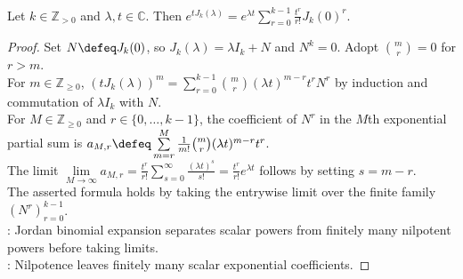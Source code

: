 \begin{proposition} \label{prop:exponential-of-jordan-block} \\
Let $k\in\mathbb{Z}_{>0}$ and $\lambda,t\in\mathbb{C}$. Then $e^{tJ_k(\lambda)}=e^{\lambda t}\sum\limits_{r=0}^{k-1}\frac{t^r}{r!}J_k(0)^r$.
\begin{proof}
Set $N\defeq J_k(0)$, so $J_k(\lambda)=\lambda I_k+N$ and $N^k=0$. Adopt $\binom{m}{r}=0$ for $r>m$.\\
For $m\in\mathbb{Z}_{\geq0}$, $(tJ_k(\lambda))^m=\sum\limits_{r=0}^{k-1}\binom{m}{r}(\lambda t)^{m-r}t^rN^r$ by induction and commutation of $\lambda I_k$ with $N$.\\
For $M\in\mathbb{Z}_{\geq0}$ and $r\in\{0,\ldots,k-1\}$, the coefficient of $N^r$ in the $M$th exponential partial sum is $a_{M,r}\defeq\sum\limits_{m=r}^{M}\frac{1}{m!}\binom{m}{r}(\lambda t)^{m-r}t^r$.\\
The limit $\lim\limits_{M\to\infty}a_{M,r}=\frac{t^r}{r!}\sum\limits_{s=0}^{\infty}\frac{(\lambda t)^s}{s!}=\frac{t^r}{r!}e^{\lambda t}$ follows by setting $s=m-r$.\\
The asserted formula holds by taking the entrywise limit over the finite family $(N^r)_{r=0}^{k-1}$.\\
: Jordan binomial expansion separates scalar powers from finitely many nilpotent powers before taking limits.\\
: Nilpotence leaves finitely many scalar exponential coefficients.
\end{proof}
\end{proposition}

